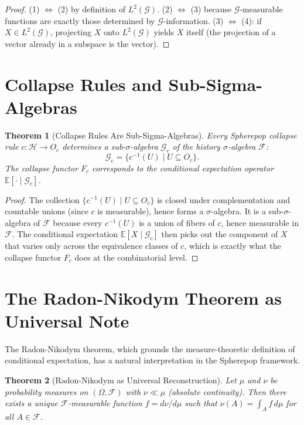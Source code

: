 \documentclass[12pt, a4paper, openany]{book}
\theoremstyle{plain}
\newtheorem{theorem}{Theorem}[chapter]
\theoremstyle{definition}
\theoremstyle{remark}
\newcommand{\calH}{\mathcal{H}}
\begin{document}
\begin{proof}
(1) $\Leftrightarrow$ (2) by definition of $L^2(\mathcal{G})$. (2) $\Leftrightarrow$
(3) because $\mathcal{G}$-measurable functions are exactly those determined by
$\mathcal{G}$-information. (3) $\Leftrightarrow$ (4): if $X \in L^2(\mathcal{G})$,
projecting $X$ onto $L^2(\mathcal{G})$ yields $X$ itself (the projection of a
vector already in a subspace is the vector).
\end{proof}

\section{Collapse Rules and Sub-Sigma-Algebras}

\begin{theorem}[Collapse Rules Are Sub-Sigma-Algebras]
Every Spherepop collapse rule $c : \calH \to O_c$ determines a sub-$\sigma$-algebra
$\mathcal{G}_c$ of the history $\sigma$-algebra $\mathcal{F}$:
\[
\mathcal{G}_c = \{c^{-1}(U) \mid U \subseteq O_c\}.
\]
The collapse functor $F_c$ corresponds to the conditional expectation operator
$\mathbb{E}[\cdot \mid \mathcal{G}_c]$.
\end{theorem}

\begin{proof}
The collection $\{c^{-1}(U) \mid U \subseteq O_c\}$ is closed under
complementation and countable unions (since $c$ is measurable), hence forms a
$\sigma$-algebra. It is a sub-$\sigma$-algebra of $\mathcal{F}$ because every
$c^{-1}(U)$ is a union of fibers of $c$, hence measurable in $\mathcal{F}$.
The conditional expectation $\mathbb{E}[X \mid \mathcal{G}_c]$ then picks out
the component of $X$ that varies only across the equivalence classes of $c$,
which is exactly what the collapse functor $F_c$ does at the combinatorial level.
\end{proof}

\section{The Radon-Nikodym Theorem as Universal Note}

The Radon-Nikodym theorem, which grounds the measure-theoretic definition of
conditional expectation, has a natural interpretation in the Spherepop framework.

\begin{theorem}[Radon-Nikodym as Universal Reconstruction]
Let $\mu$ and $\nu$ be probability measures on $(\Omega, \mathcal{F})$ with
$\nu \ll \mu$ (absolute continuity). Then there exists a unique
$\mathcal{F}$-measurable function $f = d\nu/d\mu$ such that
$\nu(A) = \int_A f \, d\mu$ for all $A \in \mathcal{F}$.
\end{theorem}
\end{document}
